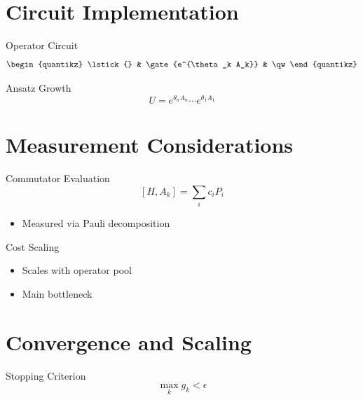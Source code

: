 \documentclass{beamer}
\begin{document}
\section{Circuit Implementation}

\begin{frame}{Operator Circuit}
\[
\begin{quantikz}
\lstick{} & \gate{e^{\theta_k A_k}} & \qw
\end{quantikz}
\]
\end{frame}


\begin{frame}{Ansatz Growth}
\[
U = e^{\theta_n A_n}\cdots e^{\theta_1 A_1}
\]
\end{frame}

\section{Measurement Considerations}

\begin{frame}{Commutator Evaluation}
\[
[H,A_k] = \sum_i c_i P_i
\]
\begin{itemize}
\item Measured via Pauli decomposition
\end{itemize}
\end{frame}


\begin{frame}{Cost Scaling}
\begin{itemize}
\item Scales with operator pool
\item Main bottleneck
\end{itemize}
\end{frame}

\section{Convergence and Scaling}

\begin{frame}{Stopping Criterion}
\[
\max_k g_k < \epsilon
\]
\end{frame}
\end{document}
